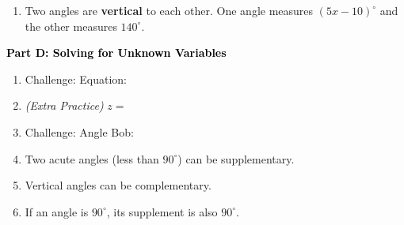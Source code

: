 \documentclass[12pt, letterpaper, fleqn]{article}
\newcommand{\blank}{\underline{\hspace{2.2cm}}}
\newcommand{\blanklong}{\underline{\hspace{6.5cm}}}
\begin{document}
\vspace{3mm}

\begin{enumerate}[itemsep=2.5cm, leftmargin=0.6cm, resume]
\begin{itemize}
\item Challenge: $z = $ \blank
\item Challenge: Angle Liam: \blank
\end{itemize}
\item Two angles are \textbf{vertical} to each other. One angle measures $(5x - 10)^\circ$ and the other measures $140^\circ$.
\end{enumerate}

\newpage

\begin{tcolorbox}[colback=customteal!20]
\large\textcolor{black}{\textbf{Part D: Solving for Unknown Variables}}
\end{tcolorbox}

\vspace{3mm}

\begin{enumerate}[itemsep=2.5cm, leftmargin=0.6cm, resume]
\item Challenge: Equation: \blanklong
\item \textit{(Extra Practice)} $z = $ \blank
\item Challenge: Angle Bob: \blank
\item Two acute angles (less than $90^\circ$) can be supplementary. \hfill \blank
\item Vertical angles can be complementary. \hfill \blank
\item If an angle is $90^\circ$, its supplement is also $90^\circ$. \hfill \blank
\end{enumerate}
\end{document}
